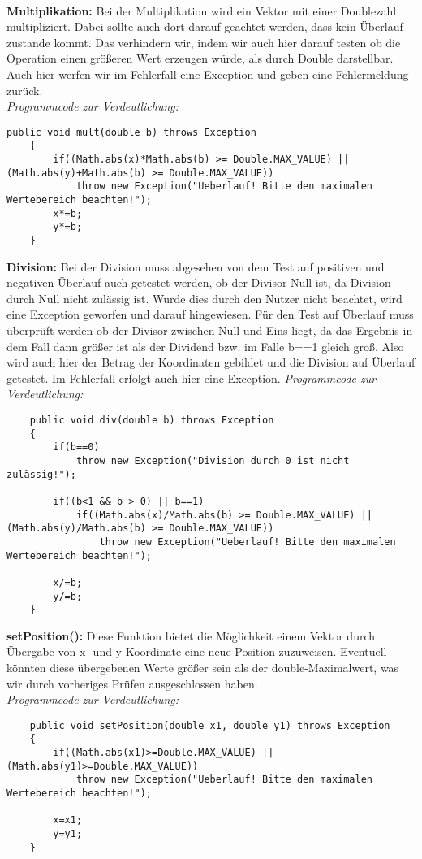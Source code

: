 \documentclass[a4paper,11pt]{scrartcl}
\begin{document}
\\
\textbf{Multiplikation:} Bei der Multiplikation wird ein Vektor mit einer Doublezahl multipliziert. Dabei sollte auch dort darauf geachtet werden, dass kein Überlauf zustande kommt. Das verhindern wir, indem wir auch hier darauf testen ob die Operation einen größeren Wert erzeugen würde, als durch Double darstellbar. Auch hier werfen wir im Fehlerfall eine Exception und geben eine Fehlermeldung zurück.\\
\textit{Programmcode zur Verdeutlichung:}
\begin{lstlisting}
public void mult(double b) throws Exception
	{
		if((Math.abs(x)*Math.abs(b) >= Double.MAX_VALUE) || (Math.abs(y)+Math.abs(b) >= Double.MAX_VALUE))
			throw new Exception("Ueberlauf! Bitte den maximalen Wertebereich beachten!");
		x*=b;
		y*=b;
	}
\end{lstlisting} $\;$ \\
\textbf{Division:} Bei der Division muss abgesehen von dem Test auf positiven und negativen Überlauf auch getestet werden, ob der Divisor Null ist, da Division durch Null nicht zulässig ist. Wurde dies durch den Nutzer nicht beachtet, wird eine Exception geworfen und darauf hingewiesen.
Für den Test auf Überlauf muss überprüft werden ob der Divisor zwischen Null und Eins liegt, da das Ergebnis in dem Fall dann größer ist als der Dividend bzw. im Falle b==1 gleich groß. Also wird auch hier der Betrag der Koordinaten gebildet und die Division auf Überlauf getestet. Im Fehlerfall erfolgt auch hier eine Exception.
\textit{Programmcode zur Verdeutlichung:}
\begin{lstlisting}
	public void div(double b) throws Exception
	{
		if(b==0)
			throw new Exception("Division durch 0 ist nicht zulässig!");
		
		if((b<1 && b > 0) || b==1)
			if((Math.abs(x)/Math.abs(b) >= Double.MAX_VALUE) || (Math.abs(y)/Math.abs(b) >= Double.MAX_VALUE))
				throw new Exception("Ueberlauf! Bitte den maximalen Wertebereich beachten!");
		
		x/=b;
		y/=b;
	}
\end{lstlisting} $\;$ \\
\textbf{setPosition(): } Diese Funktion bietet die Möglichkeit einem Vektor durch Übergabe von x- und y-Koordinate eine neue Position zuzuweisen. Eventuell könnten diese übergebenen Werte größer sein als der double-Maximalwert, was wir durch vorheriges Prüfen ausgeschlossen haben.\\
\textit{Programmcode zur Verdeutlichung:}
\begin{lstlisting}
	public void setPosition(double x1, double y1) throws Exception
	{
		if((Math.abs(x1)>=Double.MAX_VALUE) || (Math.abs(y1)>=Double.MAX_VALUE))
			throw new Exception("Ueberlauf! Bitte den maximalen Wertebereich beachten!");
		
		x=x1;
		y=y1;
	}
\end{lstlisting} $\;$ \\
\end{document}
